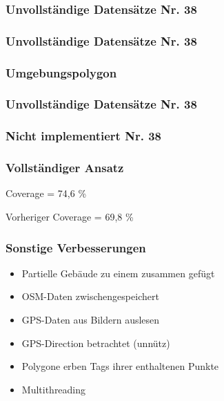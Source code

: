 \begin{frame}
  \frametitle{Unvollständige Datensätze \hfill Nr. 38}
\end{frame}


\begin{frame}
  \frametitle{Unvollständige Datensätze \hfill Nr. 38}
\end{frame}


\begin{frame}
  \frametitle{Umgebungspolygon}
\end{frame}


\begin{frame}
  \frametitle{Unvollständige Datensätze \hfill Nr. 38}
\end{frame}

\begin{frame}
  \frametitle{Nicht implementiert \hfill Nr. 38}
\end{frame}


\begin{frame}
  \frametitle{Vollständiger Ansatz}
  \begin{center}
  \huge{Coverage = 74,6 \%}
  \end{center}
  \begin{center}
  Vorheriger Coverage =  69,8 \%
  \end{center}
\end{frame}

\begin{frame}
  \frametitle{Sonstige Verbesserungen}
  \begin{itemize}
    \item<1-> Partielle Gebäude zu einem zusammen gefügt
    \item<2-> OSM-Daten zwischengespeichert
    \item<3-> GPS-Daten aus Bildern auslesen
    \item<4-> GPS-Direction betrachtet (unnütz)
    \item<5-> Polygone erben Tags ihrer enthaltenen Punkte
    \item<6-> Multithreading
  \end{itemize}
\end{frame}

